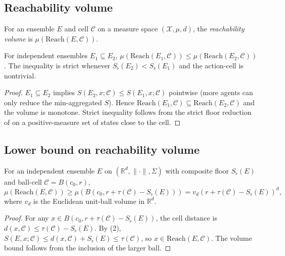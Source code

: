 \documentclass[11pt,twocolumn,a4paper]{article}
\newcommand{\R}{\mathbb{R}}
\newcommand{\X}{\mathcal{X}}
\newcommand{\Cell}{\mathcal{C}}
\newcommand{\Sfloor}{S_{\flat}}
\newcommand{\norm}[1]{\lVert#1\rVert}
\newcommand{\Reach}{\mathrm{Reach}}
\begin{document}
\subsection{Reachability volume}

\begin{definition}\label{def:rvol}
For an ensemble $E$ and cell $\Cell$ on a measure space $(\X,\mu,d)$,
the \emph{reachability volume} is
$\mu(\Reach(E,\Cell))$.
\end{definition}

\begin{theorem}\label{thm:rvol-mono}
For independent ensembles $E_1\subseteq E_2$,
$\mu(\Reach(E_1,\Cell))\le\mu(\Reach(E_2,\Cell))$. The inequality is
strict whenever $\Sfloor(E_2)<\Sfloor(E_1)$ and the action-cell is
nontrivial.
\end{theorem}

\begin{proof}
$E_1\subseteq E_2$ implies $S(E_2,x;\Cell)\le S(E_1,x;\Cell)$
pointwise (more agents can only reduce the min-aggregated $S$). Hence
$\Reach(E_1,\Cell)\subseteq\Reach(E_2,\Cell)$ and the volume is
monotone. Strict inequality follows from the strict floor reduction
of  on a positive-measure set of states close to
the cell.
\end{proof}

\subsection{Lower bound on reachability volume}

\begin{theorem}\label{thm:rlb}
For an independent ensemble $E$ on $(\R^d,\norm{\cdot},\Sigma)$ with
composite floor $\Sfloor(E)$ and ball-cell $\Cell=B(c_0,r)$,
\[
\mu(\Reach(E,\Cell))\ge\mu(B(c_0,r+\tau(\Cell)-\Sfloor(E)))
=v_d(r+\tau(\Cell)-\Sfloor(E))^d,
\]
where $v_d$ is the Euclidean unit-ball volume in $\R^d$.
\end{theorem}

\begin{proof}
For any $x\in B(c_0,r+\tau(\Cell)-\Sfloor(E))$, the cell distance is
$d(x,\Cell)\le\tau(\Cell)-\Sfloor(E)$. By (2),
$S(E,x;\Cell)\le d(x,\Cell)+\Sfloor(E)\le\tau(\Cell)$, so
$x\in\Reach(E,\Cell)$. The volume bound follows from the inclusion
of the larger ball.
\end{proof}
\end{document}
